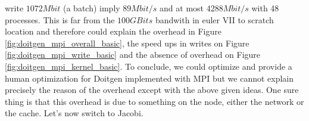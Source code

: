 write $1072Mbit$ (a batch) imply $89Mbit/s$ and at most $4288Mbit/s$ with 48 processes. This is far from the $100GBits$ bandwith in euler VII to scratch location and therefore could explain the overhead in Figure \ref{fig:doitgen_mpi_overall_basic}, the speed ups in writes on Figure \ref{fig:doitgen_mpi_write_basic} and the absence of overhead on Figure \ref{fig:doitgen_mpi_kernel_basic}.
To conclude, we could optimize and provide a human optimization for Doitgen implemented with MPI but we cannot explain precisely the reason of the overhead except with the above given ideas. One sure thing is that this overhead is due to something on the node, either the network or the cache. Let's now switch to Jacobi.



